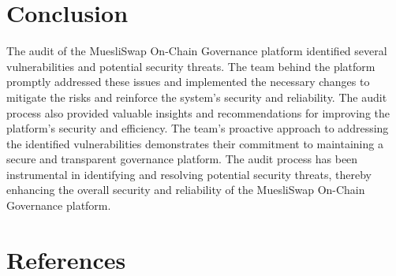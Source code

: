 \documentclass[11pt]{article}
\begin{document}
\section{Conclusion}

The audit of the MuesliSwap On-Chain Governance platform identified several vulnerabilities and potential security threats.
The team behind the platform promptly addressed these issues and implemented the necessary changes to mitigate the risks and reinforce the system's security and reliability.
The audit process also provided valuable insights and recommendations for improving the platform's security and efficiency.
The team's proactive approach to addressing the identified vulnerabilities demonstrates their commitment to maintaining a secure and transparent governance platform.
The audit process has been instrumental in identifying and resolving potential security threats, thereby enhancing the overall security and reliability of the MuesliSwap On-Chain Governance platform.


\section{References}

\printbibliography
\end{document}
